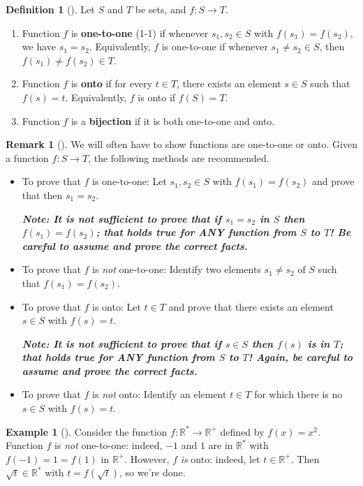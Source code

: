 \documentclass[10pt,]{book}
\newcommand{\alert}[1]{\textbf{\textit{#1}}}
\newcommand{\terminology}[1]{\textbf{#1}}
\theoremstyle{plain}
\theoremstyle{definition}
\newtheorem{definition}[theorem]{Definition}
\theoremstyle{definition}
\newtheorem{remark}[theorem]{Remark}
\theoremstyle{definition}
\newtheorem{example}[theorem]{Example}
\theoremstyle{definition}
\numberwithin{equation}{section}
\def\R{\mathbb{R}}
\begin{document}
\begin{definition}[{}]\label{definition-9}
Let \(S\) and \(T\) be sets, and \(f:S\to T\). \leavevmode%
\begin{enumerate}
\item\hypertarget{li-9}{}Function \(f\) is \terminology{one-to-one} (1-1) if whenever \(s_1, s_2\in S\) with \(f(s_1)=f(s_2)\), we have \(s_1=s_2\).  Equivalently, \(f\) is one-to-one if whenever \(s_1\neq s_2 \in S\), then \(f(s_1)\neq f(s_2) \in T\).%
\item\hypertarget{li-10}{}Function \(f\) is \terminology{onto} if for every \(t\in T\), there exists an element \(s\in S\) such that \(f(s)=t\).  Equivalently, \(f\) is onto if \(f(S)=T\).%
\item\hypertarget{li-11}{}Function \(f\) is a \terminology{bijection} if it is both one-to-one and onto.%
\end{enumerate}
%
\end{definition}
\begin{remark}[]\label{remark-2}
We will often have to show functions are one-to-one or onto. Given a function \(f:S\to T\), the following methods are recommended.%
\leavevmode%
\begin{itemize}[label=\textbullet]
\item{}To prove that \(f\) is one-to-one: Let \(s_1,s_2 \in S\) with \(f(s_1)=f(s_2)\) and prove that then \(s_1=s_2\).%
\par
\alert{Note: It is \emph{not} sufficient to prove that if \(s_1=s_2\) in \(S\) then \(f(s_1)=f(s_2)\); that holds true for ANY function from \(S\) to \(T\)!  Be careful to \emph{assume} and \emph{prove} the correct facts.}%
\item{}To prove that \(f\) is \emph{not} one-to-one: Identify two elements \(s_1 \neq s_2\) of \(S\) such that \(f(s_1)=f(s_2)\).%
\item{}To prove that \(f\) is onto: Let \(t\in T\) and prove that there exists an element \(s\in S\) with \(f(s)=t\).%
\par
\alert{Note: It is \emph{not} sufficient to prove that if \(s\in S\) then \(f(s)\) is in \(T\); that holds true for ANY function from \(S\) to \(T\)!  Again, be careful to \emph{assume} and \emph{prove} the correct facts.}%
\item{}To prove that \(f\) is \emph{not} onto: Identify an element \(t\in T\) for which there is no \(s\in S\) with \(f(s)=t\).%
\end{itemize}
\end{remark}
\begin{example}[]\label{example-6}
Consider the function \(f: \R^* \to \R^+\) defined by \(f(x)=x^2\). Function \(f\) is \emph{not} one-to-one: indeed, \(-1\) and \(1\) are in \(\R^*\) with \(f(-1)=1=f(1)\) in \(\R^+\). However, \(f\) \emph{is} onto: indeed, let \(t\in \R^+\). Then \(\sqrt{t} \in \R^*\) with \(t=f(\sqrt{t})\), so we're done.%
\end{example}
\end{document}
